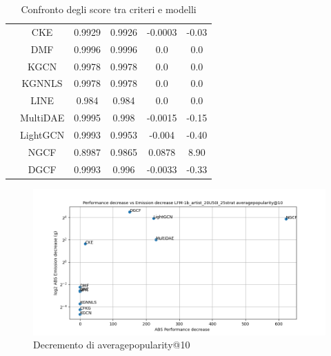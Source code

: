 \begin{table}[H]
{\begin{tabular}{|c|c|c|c|c|c|}
                                            & CKE & 0.9929 & 0.9926 & -0.0003 & -0.03 \\ \cline{2-6}
                                            & DMF & 0.9996 & 0.9996 & 0.0 & 0.0 \\ \cline{2-6}
                                            & KGCN & 0.9978 & 0.9978 & 0.0 & 0.0 \\ \cline{2-6}
                                            & KGNNLS & 0.9978 & 0.9978 & 0.0 & 0.0 \\ \cline{2-6}
                                            & LINE & 0.984 & 0.984 & 0.0 & 0.0 \\ \cline{2-6}
                                            & MultiDAE & 0.9995 & 0.998 & -0.0015 & -0.15 \\ \cline{2-6}
                                            & LightGCN & 0.9993 & 0.9953 & -0.004 & -0.40 \\ \cline{2-6}
                                            & NGCF & 0.8987 & 0.9865 & 0.0878 & 8.90 \\ \cline{2-6}
                                            & DGCF & 0.9993 & 0.996 & -0.0033 & -0.33 \\ \cline{2-6}
            \hline
        \end{tabular}
    }
    \caption{Confronto degli score tra criteri e modelli}
\end{table}




\begin{figure}[H]
    \centering
     \includegraphics[width=\textwidth]{images/decrement_averagepopularity@10_LFM-1b_artist_20U50I_25strat.png}
    \caption{Decremento di averagepopularity@10}
\end{figure}

